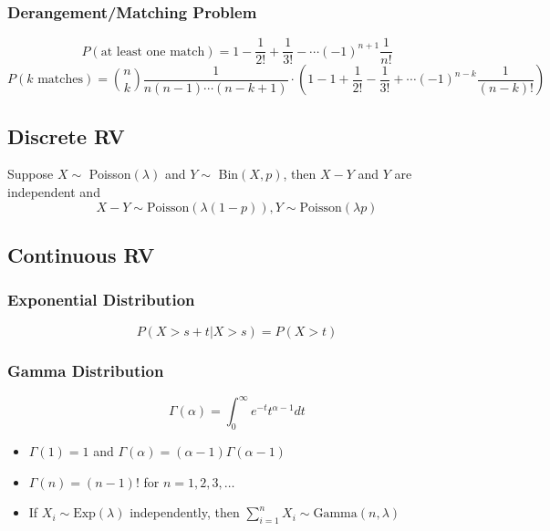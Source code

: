 \documentclass{article}
\begin{document}
\subsubsection*{Derangement/Matching Problem}
$$P(\text{at least one match}) = 1 - \frac{1}{2!}+\frac{1}{3!} -\cdots (-1)^{n+1}\frac{1}{n!}$$
$$P(k\text{ matches}) = {n \choose k} \frac{1}{n(n-1)\cdots(n-k+1)}\cdot \left({1- 1 + \frac{1}{2!}-\frac{1}{3!} +\cdots (-1)^{n-k}\frac{1}{(n-k)!}}\right)$$

\begin{multicols}{2}


\subsection{Discrete RV}
Suppose $X \sim$ Poisson$(\lambda)$ and $Y \sim$ Bin$(X,p)$, then
$X-Y$ and $Y$ are independent and 
$$X-Y \sim \text{Poisson}(\lambda(1-p)), Y \sim \text{Poisson}(\lambda p)$$

\subsection{Continuous RV}
\subsubsection*{Exponential Distribution}
\begin{equation*}
 P(X>s+t| X>s) = P(X>t)
\end{equation*}
\subsubsection*{Gamma Distribution}
\begin{equation*}
 \Gamma(\alpha) = \int_{0}^{\infty}e^{-t}t^{\alpha-1}dt
\end{equation*}
\begin{itemize}
 \item $\Gamma(1)= 1$  and $\Gamma(\alpha) = (\alpha-1)\Gamma(\alpha-1)$
 \item $\Gamma(n)=(n-1)!$ for $n = 1,2,3,\dots$
 \item If $X_i \sim \text{Exp}(\lambda)$ independently, then $\sum_{i=1}^n X_i \sim \text{Gamma}(n,\lambda)$
 
\end{itemize}


\end{multicols}
\end{document}
